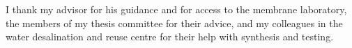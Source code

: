 I thank my advisor for his guidance and for access to the membrane laboratory, the members of my
thesis committee for their advice, and my colleagues in the water desalination and reuse centre
for their help with synthesis and testing.
